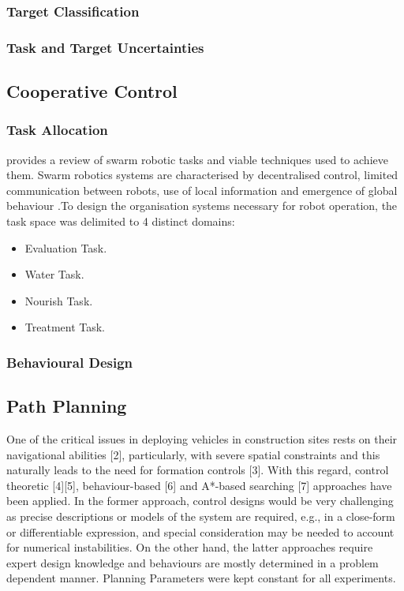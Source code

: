 \documentclass{report}
\begin{document}
\subsubsection{Target Classification}
\subsubsection{Task and Target Uncertainties}

\subsection{Cooperative Control}

\subsubsection{Task Allocation}
\cite{Bayindir2016} provides a review of swarm robotic tasks and viable techniques used to achieve them.
Swarm robotics systems are characterised by decentralised control, limited communication between robots, use of local information and emergence of global behaviour \cite{Dorigo2013}.To design the organisation systems necessary for robot operation, the task space was delimited to 4 distinct domains:
\begin{itemize}
	\item Evaluation Task.
	\item Water Task.
	\item Nourish Task.
	\item Treatment Task.
\end{itemize}

\subsubsection{Behavioural Design}

\subsection{Path Planning}
One of the critical issues in deploying vehicles in construction sites rests on their navigational abilities [2], particularly, with severe spatial constraints and this naturally leads to the need for formation controls [3]. With this regard, control theoretic [4][5], behaviour-based [6] and A*-based searching [7] approaches have been applied. In the former approach, control designs would be very challenging as precise descriptions or models of the system are required, e.g., in a close-form or differentiable expression, and special consideration may be needed to account for numerical instabilities. On the other hand, the latter approaches require expert design knowledge and behaviours are mostly determined in a problem dependent manner.
Planning Parameters were kept constant for all experiments.
\end{document}
